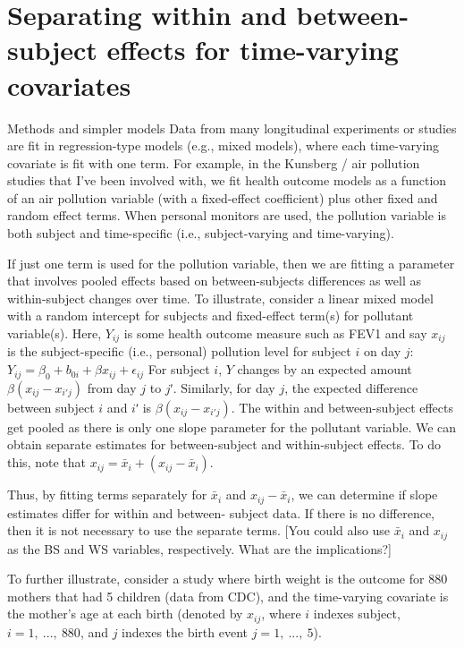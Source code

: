\documentclass[
  9pt,
  ignorenonframetext,
]{beamer}
\begin{document}
\hypertarget{separating-within-and-between-subject-effects-for-time-varying-covariates}{%
\section{Separating within and between-subject effects for time-varying
covariates}\label{separating-within-and-between-subject-effects-for-time-varying-covariates}}

\begin{frame}{Methods and simpler models}
\protect\hypertarget{methods-and-simpler-models}{}
Data from many longitudinal experiments or studies are fit in
regression-type models (e.g., mixed models), where each time-varying
covariate is fit with one term. For example, in the Kunsberg / air
pollution studies that I've been involved with, we fit health outcome
models as a function of an air pollution variable (with a fixed-effect
coefficient) plus other fixed and random effect terms. When personal
monitors are used, the pollution variable is both subject and
time-specific (i.e., subject-varying and time-varying).

If just one term is used for the pollution variable, then we are fitting
a parameter that involves pooled effects based on between-subjects
differences as well as within-subject changes over time. To illustrate,
consider a linear mixed model with a random intercept for subjects and
fixed-effect term(s) for pollutant variable(s). Here, \(Y_{ij}\) is some
health outcome measure such as FEV1 and say \(x_{ij}\) is the
subject-specific (i.e., personal) pollution level for subject \(i\) on
day \(j\): \(Y_{ij}= \beta_0+b_{0i}+\beta x_{ij}+\epsilon _{ij}\) For
subject \(i\), \(Y\) changes by an expected amount
\(\beta (x_{ij}-x_{i'j})\) from day \(j\) to \(jʹ\). Similarly, for day
\(j\), the expected difference between subject \(i\) and \(iʹ\) is
\(\beta (x_{ij}-x_{i'j})\). The within and between-subject effects get
pooled as there is only one slope parameter for the pollutant variable.
We can obtain separate estimates for between-subject and within-subject
effects. To do this, note that \(x_{ij}=\bar x_i+(x_{ij}-\bar x_i)\).
\end{frame}

\begin{frame}{}
\protect\hypertarget{section-2}{}
Thus, by fitting terms separately for \(\bar x_i\) and
\(x_{ij}-\bar x_i\), we can determine if slope estimates differ for
within and between- subject data. If there is no difference, then it is
not necessary to use the separate terms. {[}You could also use
\(\bar x_i\) and \(x_{ij}\) as the BS and WS variables, respectively.
What are the implications?{]}

To further illustrate, consider a study where birth weight is the
outcome for 880 mothers that had 5 children (data from CDC), and the
time-varying covariate is the mother's age at each birth (denoted by
\(x_{ij}\), where \(i\) indexes subject, \(i=1,\ ...,\ 880\), and \(j\)
indexes the birth event \(j=1,\ ...,\ 5\)).
\end{frame}
\end{document}
